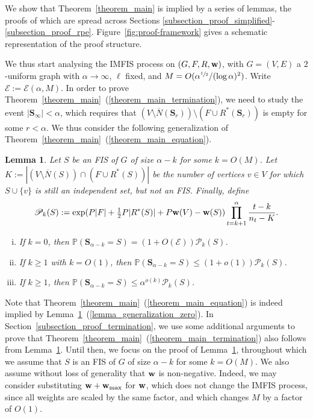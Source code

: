 \documentclass{article}
\theoremstyle{plain}
\theoremstyle{remark}
\theoremstyle{plain}
\newtheorem{lemma}[theorem]{Lemma}
\numberwithin{equation}{section}
\renewcommand{\b}{{\bf{w}}}
\begin{document}
	We show that Theorem~\ref{theorem_main} is implied by a series of lemmas, the proofs of which are spread across Sections \ref{subsection_proof_simplified}-\ref{subsection_proof_rpe}.
	Figure~\ref{fig:proof-framework} gives a schematic representation of the proof structure.
	
	
	
	We thus start analysing the IMFIS process on $(G,F,R,\b)$, with $G=(V,E)$ a $2$-uniform graph with $\alpha\to\infty$, $\ell$ fixed, and $M=O(\alpha^{\sfrac12}/(\log\alpha)^2)$. Write $\mathscr{E}:=\mathscr{E}(\alpha,M)$. In order to prove Theorem~\ref{theorem_main}~(\ref{theorem_main_termination}), we need to study the event $|\boldsymbol{S}_{\infty}|<\alpha$, which requires that $(V\setminus\overline{N}(\boldsymbol{S}_r))\setminus(F\cup R^*(\boldsymbol{S}_r))$ is empty for some $r<\alpha$. We thus consider the following generalization of Theorem~\ref{theorem_main}~(\ref{theorem_main_equation}).
	
	\begin{lemma}\label{lemma_generalization}
		Let $S$ be an FIS of $G$ of size $\alpha-k$ for some $k=O(M)$. Let $K:=|(V\setminus\overline{N}(S))\cap(F\cup R^*(S))|$ be the number of vertices $v\in V$ for which $S\cup\{v\}$ is still an independent set, but not an FIS. Finally, define $$\mathscr{P}_k(S):=\exp(P|F|+\tfrac12P|R^*(S)|+P\b(V)-\b(S))\prod_{t=k+1}^{\alpha}\frac{t-k}{n_t-K}.$$
		\begin{enumerate}[(i)]
			\item\label{lemma_generalization_zero} If $k=0$, then $\mathbb{P}(\boldsymbol{S}_{\alpha-k}=S)=(1+O(\mathscr{E}))\mathscr{P}_k(S)$.
			\item\label{lemma_generalization_small} If $k\geq1$ with $k=O(1)$, then $\mathbb{P}(\boldsymbol{S}_{\alpha-k}=S)\leq(1+o(1))\mathscr{P}_k(S)$.
			\item\label{lemma_generalization_large} If $k\geq1$, then $\mathbb{P}(\boldsymbol{S}_{\alpha-k}=S)\leq\alpha^{o(k)}\mathscr{P}_k(S)$.
		\end{enumerate}
	\end{lemma}
	
	Note that Theorem~\ref{theorem_main}~(\ref{theorem_main_equation}) is indeed implied by Lemma~\ref{lemma_generalization}~(\ref{lemma_generalization_zero}). In Section~\ref{subsection_proof_termination}, we use some additional arguments to prove that Theorem~\ref{theorem_main}~(\ref{theorem_main_termination}) also follows from Lemma~\ref{lemma_generalization}. Until then, we focus on the proof of Lemma~\ref{lemma_generalization}, throughout which we assume that $S$ is an FIS of $G$ of size $\alpha-k$ for some $k=O(M)$. We also assume without loss of generality that $\b$ is non-negative. Indeed, we may consider substituting $\b+\b_{\max}$ for $\b$, which does not change the IMFIS process, since all weights are scaled by the same factor, and which changes $M$ by a factor of $O(1)$.
	
\end{document}
